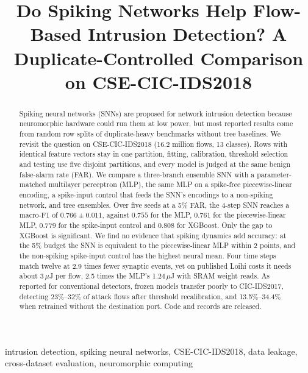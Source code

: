 \documentclass[conference]{IEEEtran}
\begin{document}
\title{Do Spiking Networks Help Flow-Based Intrusion Detection? A Duplicate-Controlled Comparison on CSE-CIC-IDS2018}

\author{
}

\maketitle

\begin{abstract}
Spiking neural networks (SNNs) are proposed for network intrusion detection because neuromorphic hardware could run them at low power, but most reported results come from random row splits of duplicate-heavy benchmarks without tree baselines. We revisit the question on CSE-CIC-IDS2018 (16.2 million flows, 13 classes). Rows with identical feature vectors stay in one partition, fitting, calibration, threshold selection and testing use five disjoint partitions, and every model is judged at the same benign false-alarm rate (FAR). We compare a three-branch ensemble SNN with a parameter-matched multilayer perceptron (MLP), the same MLP on a spike-free piecewise-linear encoding, a spike-input control that feeds the SNN's encodings to a non-spiking network, and tree ensembles. Over five seeds at a 5\% FAR, the 4-step SNN reaches a macro-F1 of $0.766 \pm 0.011$, against $0.755$ for the MLP, $0.761$ for the piecewise-linear MLP, $0.779$ for the spike-input control and $0.808$ for XGBoost. Only the gap to XGBoost is significant. We find no evidence that spiking dynamics add accuracy: at the 5\% budget the SNN is equivalent to the piecewise-linear MLP within 2 points, and the non-spiking spike-input control has the highest neural mean. Four time steps match twelve at 2.9 times fewer synaptic events, yet on published Loihi costs it needs about 3\,$\mu$J per flow, 2.5 times the MLP's 1.24\,$\mu$J with SRAM weight reads. As reported for conventional detectors, frozen models transfer poorly to CIC-IDS2017, detecting 23\%--32\% of attack flows after threshold recalibration, and 13.5\%--34.4\% when retrained without the destination port. Code and records are released.
\end{abstract}

\begin{IEEEkeywords}
intrusion detection, spiking neural networks, CSE-CIC-IDS2018, data leakage, cross-dataset evaluation, neuromorphic computing
\end{IEEEkeywords}
\end{document}
